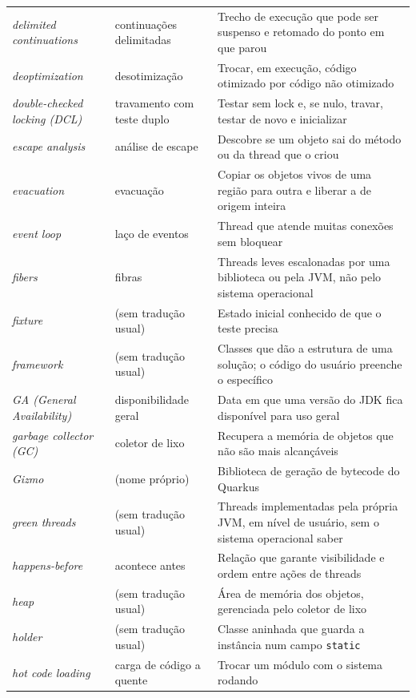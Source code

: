 \begin{longtable}{@{}>{\raggedright}p{3.9cm} >{\raggedright}p{3.6cm} >{\raggedright\arraybackslash}p{6.3cm}@{}}
\textit{delimited continuations} & continuações delimitadas & Trecho de execução que pode ser suspenso e retomado do ponto em que parou \\
\textit{deoptimization} & desotimização & Trocar, em execução, código otimizado por código não otimizado \\
\textit{double-checked locking (DCL)} & travamento com teste duplo & Testar sem lock e, se nulo, travar, testar de novo e inicializar \\
\textit{escape analysis} & análise de escape & Descobre se um objeto sai do método ou da thread que o criou \\
\textit{evacuation} & evacuação & Copiar os objetos vivos de uma região para outra e liberar a de origem inteira \\
\textit{event loop} & laço de eventos & Thread que atende muitas conexões sem bloquear \\
\textit{fibers} & fibras & Threads leves escalonadas por uma biblioteca ou pela JVM, não pelo sistema operacional \\
\textit{fixture} & (sem tradução usual) & Estado inicial conhecido de que o teste precisa \\
\textit{framework} & (sem tradução usual) & Classes que dão a estrutura de uma solução; o código do usuário preenche o específico \\
\textit{GA (General Availability)} & disponibilidade geral & Data em que uma versão do JDK fica disponível para uso geral \\
\textit{garbage collector (GC)} & coletor de lixo & Recupera a memória de objetos que não são mais alcançáveis \\
\textit{Gizmo} & (nome próprio) & Biblioteca de geração de bytecode do Quarkus \\
\textit{green threads} & (sem tradução usual) & Threads implementadas pela própria JVM, em nível de usuário, sem o sistema operacional saber \\
\textit{happens-before} & acontece antes & Relação que garante visibilidade e ordem entre ações de threads \\
\textit{heap} & (sem tradução usual) & Área de memória dos objetos, gerenciada pelo coletor de lixo \\
\textit{holder} & (sem tradução usual) & Classe aninhada que guarda a instância num campo \texttt{static} \\
\textit{hot code loading} & carga de código a quente & Trocar um módulo com o sistema rodando \\

\end{longtable}

